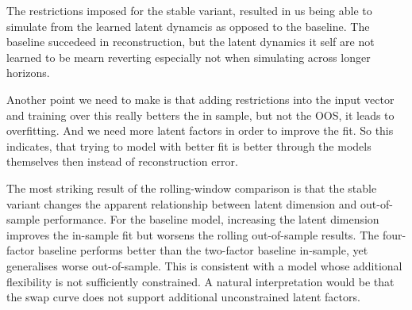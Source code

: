 The restrictions imposed for the stable variant, resulted in us being able to simulate from the learned latent dynamcis as opposed to the baseline. The baseline succedeed in reconstruction, but the latent dynamics it self are not learned to be mearn reverting especially not when simulating across longer horizons. 



Another point we need to make is that adding restrictions into the input vector and training over this really betters the in sample, but not the OOS, it leads to overfitting. And we need more latent factors in order to improve the fit. So this indicates, that trying to model with better fit is better through the models themselves then instead of reconstruction error. 








The most striking result of the rolling-window comparison is that the stable variant changes the apparent relationship between latent dimension and out-of-sample performance. For the baseline model, increasing the latent dimension improves the in-sample fit but worsens the rolling out-of-sample results. The four-factor baseline performs better than the two-factor baseline
in-sample, yet generalises worse out-of-sample. This is consistent with a model
whose additional flexibility is not sufficiently constrained. A natural
interpretation would be that the swap curve does not support additional
unconstrained latent factors.

